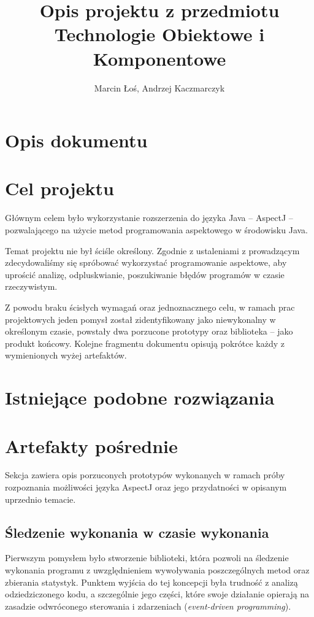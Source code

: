\documentclass[12pt,a4paper,titlepage]{article}
\title{Opis projektu z przedmiotu Technologie Obiektowe i Komponentowe}
\author{Marcin Łoś, Andrzej Kaczmarczyk}
\begin{document}
\maketitle
\pagestyle{empty}
\pagestyle{headings}

\section{Opis dokumentu}
 
\section{Cel projektu}
 Głównym celem było wykorzystanie rozszerzenia do języka Java -- AspectJ -- pozwalającego na użycie metod programowania aspektowego w środowisku Java.
 
 Temat projektu nie był ściśle określony. Zgodnie z ustaleniami z prowadzącym zdecydowaliśmy się spróbować wykorzystać programowanie aspektowe, aby uprościć analizę, odpluskwianie, poszukiwanie błędów programów w czasie rzeczywistym.
 
 Z powodu braku ścisłych wymagań oraz jednoznacznego celu, w ramach prac projektowych jeden pomysł został zidentyfikowany jako niewykonalny w określonym czasie, powstały dwa porzucone prototypy oraz biblioteka -- jako produkt końcowy. Kolejne fragmentu dokumentu opisują pokrótce każdy z wymienionych wyżej artefaktów.
 
\section{Istniejące podobne rozwiązania}

\section{Artefakty pośrednie}
 Sekcja zawiera opis porzuconych prototypów wykonanych w ramach próby rozpoznania możliwości języka AspectJ oraz jego przydatności w opisanym uprzednio temacie.
 \subsection{Śledzenie wykonania w czasie wykonania}
  Pierwszym pomysłem było stworzenie biblioteki, która pozwoli na śledzenie wykonania programu z uwzględnieniem wywoływania poszczególnych metod oraz zbierania statystyk. Punktem wyjścia do tej koncepcji była trudność z analizą odziedziczonego kodu, a szczególnie jego części, które swoje działanie opierają na zasadzie odwróconego sterowania i zdarzeniach (\emph{event-driven programming}).
  
\end{document}
